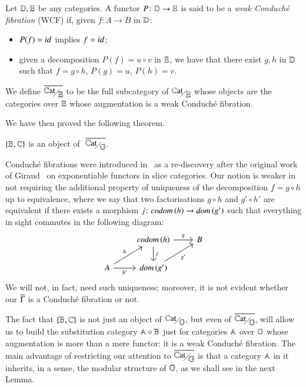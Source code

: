 \begin{definition}
    Let $\mathbb D,\mathbb E$ be any categories. A functor $P \colon \mathbb D \to \mathbb E$ is said to be a \emph{weak Conduché fibration} (WCF) if, given $f \colon A \to B$ in $\mathbb D$:
    \begin{itemize}
        \item $P(f)=\mathop{\textit{id}_{}}$ implies $f=\mathop{\textit{id}_{}}$;
        \item given a decomposition $P(f)=u \circ v$ in $\mathbb E$, we have that there exist $g,h$ in $\mathbb D$ such that $f = g \circ h$, $P(g) = u$, $P(h)=v$.
    \end{itemize}	 
    We define $\WCFover \E$ to be the full subcategory of $\catover\E$ whose objects are the categories over $\mathbb E$ whose augmentation is a weak Conduché fibration.
\end{definition}

We have then proved the following theorem.


\begin{theorem}
    $\{ \mathbb B,\mathbb C\}$ is an object of $\,\,\WCFover\gcf$.
\end{theorem}

Conduché fibrations were introduced in~\cite{conduche_au_1972} as a re-discovery after the original work of Giraud~\cite{giraud_methode_1964} on exponentiable functors in slice categories. Our  notion is weaker in not requiring the additional  property of uniqueness of the decomposition $f=g \circ h$ up to equivalence, where we say that two factorisations $g \circ h$ and $g' \circ h'$ are equivalent if there exists a morphism $j \colon \codom h \to \dom {g'}$ such that everything in sight commutes in the following diagram:
\[
\begin{tikzcd}
& \codom{h} \ar[r,"g"] \ar[d,"j"] & B \\
A \ar[ur,"h"] \ar[r,"h'"'] & \dom{g'} \ar[ur,"g'"']
\end{tikzcd}
\]
We will not, in fact, need such uniqueness; moreover, it is not evident whether our $\overline{\Gamma}$ is a Conduché fibration or not.

\begin{remark}
    The fact that $\{ \mathbb B,\mathbb C\}$ is not just an object of $\catover\gcf$, but even of $\WCFover\gcf$, will allow us to build the substitution category $\mathbb A \circ \mathbb B$ just for categories $\mathbb A$ over $\mathbb G$ whose augmentation is more than a mere functor: it is a weak Conduché fibration. %
    The main advantage of restricting our attention to $\WCFover\gcf$ is that a category $\mathbb A$ in it inherits, in a sense, the modular structure of $\mathbb G$, as we shall see in the next Lemma.
\end{remark}

